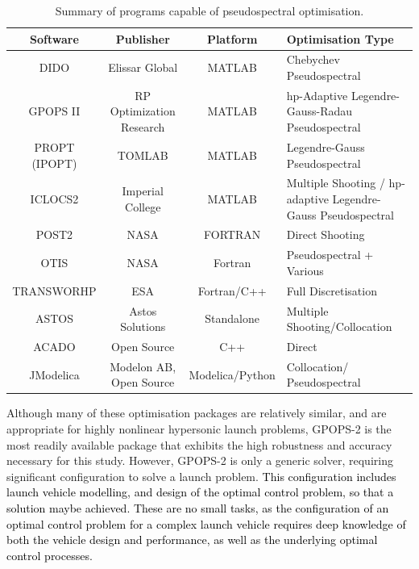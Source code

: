 \begin{table}[ht]
	
	\begin{tabular}{|c|c|c| p{4cm}|}
		\hline \textbf{Software} & \textbf{Publisher} & \textbf{Platform} & \textbf{Optimisation Type} \\ 
		\hline DIDO\cite{Ross2002} & Elissar Global & MATLAB & Chebychev Pseudospectral \\ 
		\hline GPOPS II\cite{Rao2010} & RP Optimization Research & MATLAB & \textsf{hp}-Adaptive Legendre-Gauss-Radau Pseudospectral \\ 
		\hline PROPT (IPOPT)\cite{Rutquist2010}& TOMLAB & MATLAB & Legendre-Gauss  Pseudospectral  \\ 
		\hline ICLOCS2\cite{iclocs} & Imperial College & MATLAB &  Multiple Shooting / \textsf{hp}-adaptive Legendre-Gauss Pseudospectral  \\ 
		\hline POST2\cite{WilliamColson} & NASA & FORTRAN & Direct Shooting \\ 
		\hline OTIS\cite{otis} & NASA  & Fortran & Pseudospectral + Various  \\ 
		\hline TRANSWORHP\cite{Wassel2013} & ESA & Fortran/C++ & Full Discretisation \\ 
		\hline ASTOS\cite{astos} & Astos Solutions & Standalone & Multiple Shooting/Collocation  \\  
		\hline ACADO\cite{Houska2011} & Open Source & C++ &  Direct \\  
		\hline JModelica\cite{jmodelica} & Modelon AB, Open Source & Modelica/Python &  Collocation/ Pseudospectral \\  
		
		\hline 
	\end{tabular} 
	
	\caption{Summary of programs capable of pseudospectral optimisation.}
	\label{table:programs}
\end{table}

Although many of these optimisation packages are relatively similar, and are appropriate for highly nonlinear hypersonic launch problems, GPOPS-2 is the most readily available package that exhibits the high robustness and accuracy necessary for this study. However, GPOPS-2 is only a generic solver, requiring significant configuration to solve a launch problem. \textcolor{black}{This configuration includes launch vehicle modelling, and design of the optimal control problem, so that a solution maybe achieved. These are no small tasks, as the configuration of an optimal control problem for a complex launch vehicle requires deep knowledge of both the vehicle design and performance, as well as the underlying optimal control processes. } 














